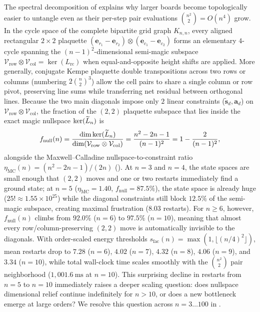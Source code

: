 The spectral decomposition of  explains why larger boards become topologically easier to untangle even as their per-step pair evaluations $\binom{n^2}{2} = O(n^4)$ grow. In the cycle space of the complete bipartite grid graph $K_{n,n}$, every aligned rectangular $2\times 2$ plaquette $(\mathbf{e}_{r_1}-\mathbf{e}_{r_2})\otimes(\mathbf{e}_{c_1}-\mathbf{e}_{c_2})$ forms an elementary $4$-cycle spanning the $(n-1)^2$-dimensional semi-magic subspace $\mathcal{V}_{\mathrm{row}}\otimes\mathcal{V}_{\mathrm{col}} = \ker(L_{\mathrm{rc}})$ when equal-and-opposite height shifts are applied. More generally, conjugate Kempe plaquette double transpositions across two rows or columns (numbering $2\binom{n}{2}^3$) allow the cell pairs to share a single column or row pivot, preserving line sums while transferring net residual between orthogonal lines. Because the two main diagonals impose only $2$ linear constraints ($\widetilde{\mathbf{s}}_d, \mathbf{a}_d$) on $\mathcal{V}_{\mathrm{row}}\otimes\mathcal{V}_{\mathrm{col}}$, the fraction of the $(2,2)$ plaquette subspace that lies inside the exact magic nullspace $\ker(\widetilde{L}_n)$ is
\begin{equation}
  f_{\mathrm{null}}(n) = \frac{\dim\ker(\widetilde{L}_n)}{\dim(\mathcal{V}_{\mathrm{row}}\otimes\mathcal{V}_{\mathrm{col}})} = \frac{n^2 - 2n - 1}{(n-1)^2} = 1 - \frac{2}{(n-1)^2},
  \label{eq:null_plaquette_fraction}
\end{equation}
alongside the Maxwell--Calladine nullspace-to-constraint ratio $\eta_{\mathrm{MC}}(n) = (n^2-2n-1)/(2n)$ (). At $n=3$ and $n=4$, the state spaces are small enough that $(2,2)$ moves and one or two restarts immediately find a ground state; at $n=5$ ($\eta_{\mathrm{MC}} = 1.40$, $f_{\mathrm{null}} = 87.5\%$), the state space is already huge ($25! \approx 1.55\times 10^{25}$) while the diagonal constraints still block $12.5\%$ of the semi-magic subspace, creating maximal frustration ($8.03$ restarts). For $n \ge 6$, however, $f_{\mathrm{null}}(n)$ climbs from $92.0\%$ ($n=6$) to $97.5\%$ ($n=10$), meaning that almost every row/column-preserving $(2,2)$ move is automatically invisible to the diagonals. With order-scaled energy thresholds $s_{\mathrm{fac}}(n) = \max(1,\lfloor(n/4)^2\rfloor)$, mean restarts drop to $7.28$ ($n=6$), $4.02$ ($n=7$), $4.32$ ($n=8$), $4.06$ ($n=9$), and $3.34$ ($n=10$), while total wall-clock time scales smoothly with the $\binom{n^2}{2}$ pair neighborhood ($1{,}001.6~\text{ms}$ at $n=10$). This surprising decline in restarts from $n=5$ to $n=10$ immediately raises a deeper scaling question: does nullspace dimensional relief continue indefinitely for $n > 10$, or does a new bottleneck emerge at large orders? We resolve this question across $n = 3\dots 100$ in .

